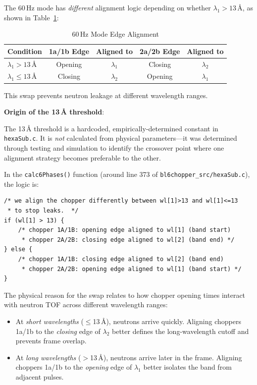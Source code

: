 \documentclass[tm]{ornltm}
\begin{document}
The 60\,Hz mode has \emph{different} alignment logic depending on whether $\lambda_1 > 13$\,\AA{}, as shown in Table~\ref{tab:60hz_alignment}:

\begin{table}[ht]
\centering

\caption{60\,Hz Mode Edge Alignment}
\label{tab:60hz_alignment}
\begin{tabular}{lcccc}
\toprule
Condition & 1a/1b Edge & Aligned to & 2a/2b Edge & Aligned to \\
\midrule
$\lambda_1 > 13$\,\AA{} & Opening & $\lambda_1$ & Closing & $\lambda_2$ \\
$\lambda_1 \leq 13$\,\AA{} & Closing & $\lambda_2$ & Opening & $\lambda_1$ \\
\bottomrule
\end{tabular}

\end{table}

This swap prevents neutron leakage at different wavelength ranges.

\textbf{Origin of the 13\,\AA{} threshold}:

The 13\,\AA{} threshold is a hardcoded, empirically-determined constant in \texttt{hexaSub.c}. It is \emph{not} calculated from physical parameters---it was determined through testing and simulation to identify the crossover point where one alignment strategy becomes preferable to the other.

In the \texttt{calc6Phases()} function (around line 373 of \texttt{bl6chopper\_src/hexaSub.c}), the logic is:

\begin{verbatim}
/* we align the chopper differently between wl[1]>13 and wl[1]<=13
 * to stop leaks.  */
if (wl[1] > 13) {
    /* chopper 1A/1B: opening edge aligned to wl[1] (band start)
     * chopper 2A/2B: closing edge aligned to wl[2] (band end) */
} else {
    /* chopper 1A/1B: closing edge aligned to wl[2] (band end)
     * chopper 2A/2B: opening edge aligned to wl[1] (band start) */
}
\end{verbatim}

The physical reason for the swap relates to how chopper opening times interact with neutron TOF across different wavelength ranges:
\begin{itemize}
    \item At \emph{short wavelengths} ($\leq$13\,\AA{}), neutrons arrive quickly. Aligning choppers 1a/1b to the \emph{closing} edge of $\lambda_2$ better defines the long-wavelength cutoff and prevents frame overlap.
    \item At \emph{long wavelengths} ($>$13\,\AA{}), neutrons arrive later in the frame. Aligning choppers 1a/1b to the \emph{opening} edge of $\lambda_1$ better isolates the band from adjacent pulses.
\end{itemize}
\end{document}
